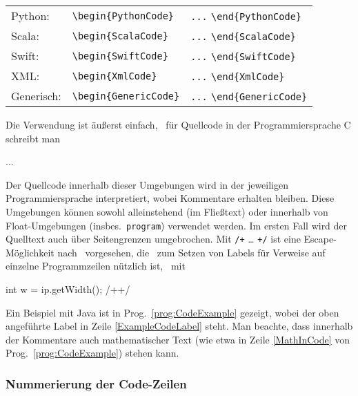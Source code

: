 \begin{table}
\begin{tabular}{@{}lll@{}}
	Python:      & \verb!\begin{PythonCode}!
		& \verb!...! \verb!\end{PythonCode}! \\
	Scala:       & \verb!\begin{ScalaCode}!
		& \verb!...! \verb!\end{ScalaCode}! \\
	Swift:       & \verb!\begin{SwiftCode}!
		& \verb!...! \verb!\end{SwiftCode}! \\
	XML:         & \verb!\begin{XmlCode}!
		& \verb!...! \verb!\end{XmlCode}! \\
	Generisch:   & \verb!\begin{GenericCode}!
		& \verb!...! \verb!\end{GenericCode}! \\
	\bottomrule
\end{tabular}
\end{table}
%
Die Verwendung ist äußerst einfach, \zB\ für Quellcode in der
Programmiersprache C schreibt man
%
\begin{GenericCode}[numbers=none]
\begin{CCode}
    ... 
\end{CCode}
\end{GenericCode}
%
Der Quellcode innerhalb dieser Umgebungen wird in der jeweiligen
Programmiersprache interpretiert, wobei Kommentare erhalten bleiben. Diese
Umgebungen können sowohl alleinstehend (im Fließtext) oder innerhalb von
Float-Umgebungen (insbes.\ \texttt{program}) verwendet werden. Im ersten Fall
wird der Quelltext auch über Seitengrenzen umgebrochen. Mit \verb!/+! \ldots
\verb!+/! ist eine Escape-Möglichkeit nach \latex\ vorgesehen, die \va\ zum
Setzen von Labels für Verweise auf einzelne Programmzeilen nützlich ist, \zB\
mit
%
\begin{GenericCode}[numbers=none]
int w = ip.getWidth(); /+\label{ExampleCodeLabel}+/
\end{GenericCode}
%
Ein Beispiel mit Java ist in Prog.~\ref{prog:CodeExample} gezeigt, wobei der
oben angeführte Label in Zeile \ref{ExampleCodeLabel} steht. Man beachte,
dass innerhalb der Kommentare auch mathematischer Text (wie etwa in Zeile
\ref{MathInCode} von Prog.~\ref{prog:CodeExample}) stehen kann.


\subsubsection{Nummerierung der Code-Zeilen}

